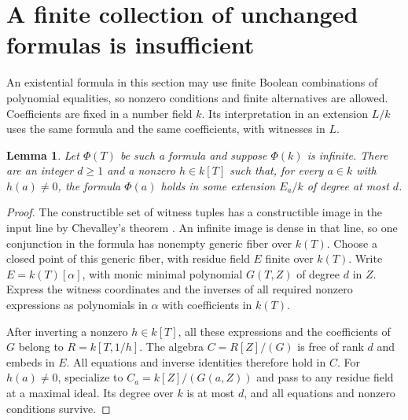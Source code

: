 \documentclass[11pt,a4paper]{article}
\newtheorem{lemma}[theorem]{Lemma}
\theoremstyle{definition}
\begin{document}
\section{A finite collection of unchanged formulas is insufficient}

An existential formula in this section may use finite Boolean
combinations of polynomial equalities, so nonzero conditions and
finite alternatives are allowed. Coefficients are fixed in a
number field $k$. Its interpretation in an extension $L/k$ uses
the same formula and the same coefficients, with witnesses in $L$.

\begin{lemma}\label{lem:generic}
Let $\Phi(T)$ be such a formula and suppose $\Phi(k)$ is infinite.
There are an integer $d\ge1$ and a nonzero $h\in k[T]$ such that,
for every $a\in k$ with $h(a)\ne0$, the formula $\Phi(a)$ holds
in some extension $E_a/k$ of degree at most $d$.
\end{lemma}
\begin{proof}
The constructible set of witness tuples has a constructible image
in the input line by Chevalley's theorem \cite{Stacks}.
An infinite image is dense in that line, so one conjunction in
the formula has nonempty generic fiber over $k(T)$.
Choose a closed point of this generic fiber, with residue field
$E$ finite over $k(T)$. Write $E=k(T)[\alpha]$, with monic
minimal polynomial $G(T,Z)$ of degree $d$ in $Z$.
Express the witness coordinates and the inverses of all required
nonzero expressions as polynomials in $\alpha$ with coefficients
in $k(T)$.

After inverting a nonzero $h\in k[T]$, all these expressions and
the coefficients of $G$ belong to $R=k[T,1/h]$. The algebra
$C=R[Z]/(G)$ is free of rank $d$ and embeds in $E$.
All equations and inverse identities therefore hold in $C$.
For $h(a)\ne0$, specialize to $C_a=k[Z]/(G(a,Z))$ and pass to
any residue field at a maximal ideal. Its degree over $k$ is
at most $d$, and all equations and nonzero conditions survive.
\end{proof}
\end{document}
